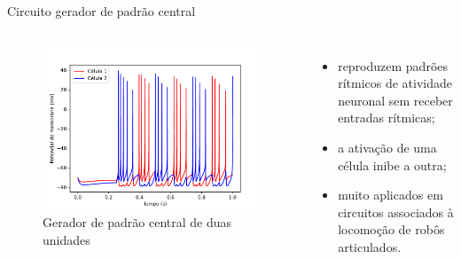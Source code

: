 \begin{frame}{Circuito gerador de padrão central}
	\begin{columns}[t]
		\column{5cm}
			\begin{figure}[tb]
				\centering
				\caption{Gerador de padrão central de duas unidades}
				\label{fig:cpg}
				\includegraphics[width=\linewidth]{figs/cpg}
			\end{figure}
		\column{5cm}
			\begin{itemize}
				\item reproduzem padrões rítmicos de atividade neuronal sem receber entradas rítmicas;
				\item a ativação de uma célula inibe a outra;
				\item muito aplicados em circuitos associados à locomoção de robôs articulados.
			\end{itemize}
	\end{columns}
\end{frame}

